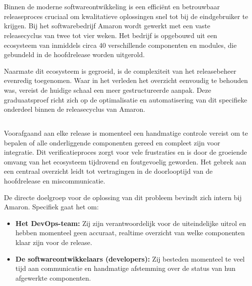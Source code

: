 
\chapter{}%
\label{ch:inleiding}

Binnen de moderne softwareontwikkeling is een efficiënt en betrouwbaar releaseproces cruciaal om kwalitatieve oplossingen snel tot bij de eindgebruiker te krijgen. Bij het softwarebedrijf Amaron wordt gewerkt met een vaste releasecyclus van twee tot vier weken. Het bedrijf is opgebouwd uit een ecosysteem van inmiddels circa 40 verschillende componenten en modules, die gebundeld in de hoofdrelease worden uitgerold. 

Naarmate dit ecosysteem is gegroeid, is de complexiteit van het releasebeheer evenredig toegenomen. Waar in het verleden het overzicht eenvoudig te behouden was, vereist de huidige schaal een meer gestructureerde aanpak. Deze graduaatsproef richt zich op de optimalisatie en automatisering van dit specifieke onderdeel binnen de releasecyclus van Amaron.

\section{}%
\label{sec:probleemstelling}

Voorafgaand aan elke release is momenteel een handmatige controle vereist om te bepalen of alle onderliggende componenten gereed en compleet zijn voor integratie. Dit verificatieproces zorgt voor vele frustraties en is door de groeiende omvang van het ecosysteem tijdrovend en foutgevoelig geworden. Het gebrek aan een centraal overzicht leidt tot vertragingen in de doorlooptijd van de hoofdrelease en miscommunicatie. 

De directe doelgroep voor de oplossing van dit probleem bevindt zich intern bij Amaron. Specifiek gaat het om:

\begin{itemize}
  \item \textbf{Het DevOps-team:} Zij zijn verantwoordelijk voor de uiteindelijke uitrol en hebben momenteel geen accuraat, realtime overzicht van welke componenten klaar zijn voor de release.
  \item \textbf{De softwareontwikkelaars (developers):} Zij besteden momenteel te veel tijd aan communicatie en handmatige afstemming over de status van hun afgewerkte componenten.
\end{itemize}

